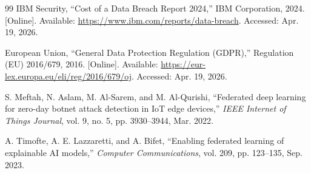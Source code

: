 \documentclass[conference]{IEEEtran}
\begin{document}
\begin{thebibliography}{99}
IBM Security, ``Cost of a Data Breach Report 2024,'' IBM Corporation, 2024. [Online]. Available: \url{https://www.ibm.com/reports/data-breach}. Accessed: Apr. 19, 2026.

European Union, ``General Data Protection Regulation (GDPR),'' Regulation (EU) 2016/679, 2016. [Online]. Available: \url{https://eur-lex.europa.eu/eli/reg/2016/679/oj}. Accessed: Apr. 19, 2026.

S. Meftah, N. Aslam, M. Al-Sarem, and M. Al-Qurishi, ``Federated deep learning for zero-day botnet attack detection in IoT edge devices,'' \emph{IEEE Internet of Things Journal}, vol. 9, no. 5, pp. 3930--3944, Mar. 2022.

A. Timofte, A. E. Lazzaretti, and A. Bifet, ``Enabling federated learning of explainable AI models,'' \emph{Computer Communications}, vol. 209, pp. 123--135, Sep. 2023.

\end{thebibliography}
\end{document}
